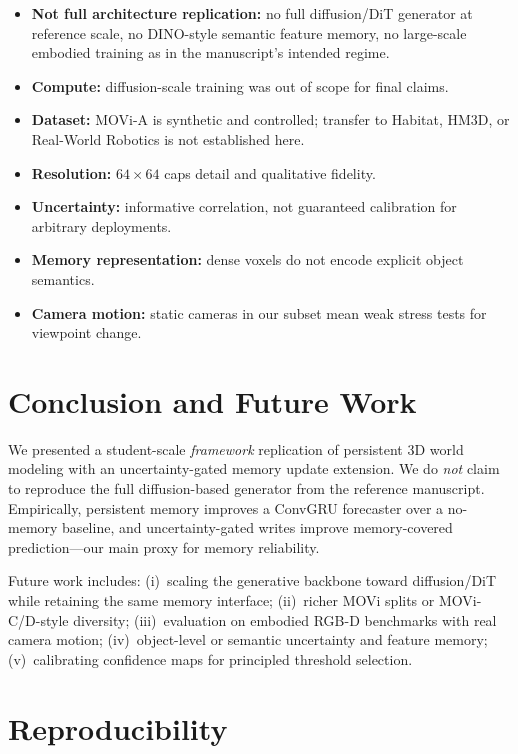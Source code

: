 \documentclass[11pt]{article}
\begin{document}
\begin{itemize}[leftmargin=1.3em,itemsep=3pt]
  \item \textbf{Not full architecture replication:} no full diffusion/DiT generator at reference scale, no
        DINO-style semantic feature memory, no large-scale embodied training as in the manuscript's intended
        regime.
  \item \textbf{Compute:} diffusion-scale training was out of scope for final claims.
  \item \textbf{Dataset:} MOVi-A is synthetic and controlled; transfer to Habitat, HM3D, or Real-World Robotics
        is not established here.
  \item \textbf{Resolution:} $64\times64$ caps detail and qualitative fidelity.
  \item \textbf{Uncertainty:} informative correlation, not guaranteed calibration for arbitrary deployments.
  \item \textbf{Memory representation:} dense voxels do not encode explicit object semantics.
  \item \textbf{Camera motion:} static cameras in our subset mean weak stress tests for viewpoint change.
\end{itemize}

\section{Conclusion and Future Work}

We presented a student-scale \emph{framework} replication of persistent 3D world modeling with an
uncertainty-gated memory update extension. We do \emph{not} claim to reproduce the full diffusion-based
generator from the reference manuscript. Empirically, persistent memory improves a ConvGRU forecaster over a
no-memory baseline, and uncertainty-gated writes improve memory-covered prediction---our main proxy for
memory reliability.

Future work includes: (i)~scaling the generative backbone toward diffusion/DiT while retaining the same
memory interface; (ii)~richer MOVi splits or MOVi-C/D-style diversity; (iii)~evaluation on embodied RGB-D
benchmarks with real camera motion; (iv)~object-level or semantic uncertainty and feature memory; (v)~calibrating
confidence maps for principled threshold selection.

\section{Reproducibility}
\label{sec:repro}
\end{document}
